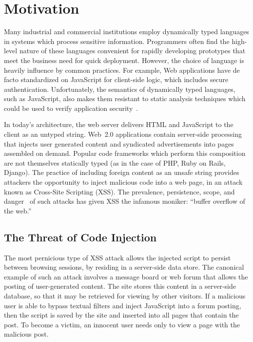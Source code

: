 
\chapter{Motivation}

Many industrial and commercial institutions employ dynamically typed languages in systems which process sensitive information.
Programmers often find the high-level nature of these languages convenient for rapidly developing prototypes that meet the business need for quick deployment.
However, the choice of language is heavily influence by common practices.
For example, Web applications have de facto standardized on JavaScript for client-side logic, which includes secure authentication.
Unfortunately, the semantics of dynamically typed languages, such as JavaScript, also makes them resistant to static analysis techniques which could be used to verify application security~\cite{static-typing}.

In today's architecture, the web server delivers HTML and JavaScript to the client as an untyped string.
Web~2.0 applications contain server-side processing that injects user generated content and syndicated advertisements into pages assembled on demand.
Popular code frameworks which perform this composition are not themselves statically typed (as in the case of PHP, Ruby on Rails, Django).
The practice of including foreign content as an unsafe string provides attackers the opportunity to inject malicious code into a web page, in an attack known as Cross-Site Scripting (XSS).
The prevalence, persistence, scope, and danger~\cite{whitehat, mitre} of such attacks has given XSS the infamous moniker: ``buffer overflow of the web.''

\section{The Threat of Code Injection}

The most pernicious type of XSS attack allows the injected script to persist between browsing sessions, by residing in a server-side data store.
The canonical example of such an attack involves a message board or web forum that allows the posting of user-generated content.
The site stores this content in a server-side database, so that it may be retrieved for viewing by other visitors.
If a malicious user is able to bypass textual filters and inject JavaScript into a forum posting, then the script is saved by the site and inserted into all pages that contain the post.
To become a victim, an innocent user needs only to view a page with the malicious post.

